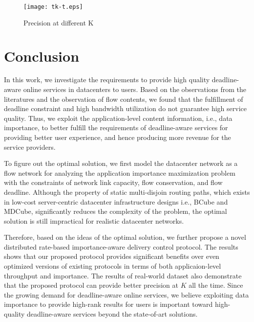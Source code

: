 \documentclass[conference]{IEEEtran}
\begin{document}
\begin{figure}
  \centering
  \texttt{[image: tk-t.eps]}\\
  \caption{Precision at different K}\label{fig:topk_t}
\end{figure}

\section{Conclusion}
In this work, we investigate the requirements to provide high quality deadline-aware online services in datacenters to users. Based on the observations from the literatures\cite{lagun2011viewser, buscher2010good, cutrell2007you, lorigo2008eye} and the observation of flow contents, we found that the fulfillment of deadline constraint and high bandwidth utilization do not guarantee high service quality. Thus, we exploit the application-level content information, i.e., data importance, to better fulfill the requirements of deadline-aware services for providing better user experience, and hence producing more revenue for the service providers.

To figure out the optimal solution, we first model the datacenter network as a flow network for analyzing the application importance maximization problem with the constraints of network link capacity, flow conservation, and flow deadline. Although the property of static multi-disjoin routing paths, which exists in low-cost server-centric datacenter infrastructure designs i.e., BCube\cite{bcube} and MDCube\cite{mdcube}, significantly reduces the complexity of the problem, the optimal solution is still impractical for realistic datacenter networks.


Therefore, based on the ideas of the optimal solution, we further propose a novel distributed rate-based importance-aware delivery control protocol. The results shows that our proposed protocol provides significant benefits over even optimized versions of existing protocols in terms of both applicaion-level throughput and importance. The results of real-world dataset also demonstrate that the proposed protocol can provide better precision at $K$ all the time. Since the growing demand for deadline-aware online services, we believe exploiting data importance to provide high-rank results for users is important toward high-quality deadline-aware services beyond the state-of-art solutions.
\end{document}
